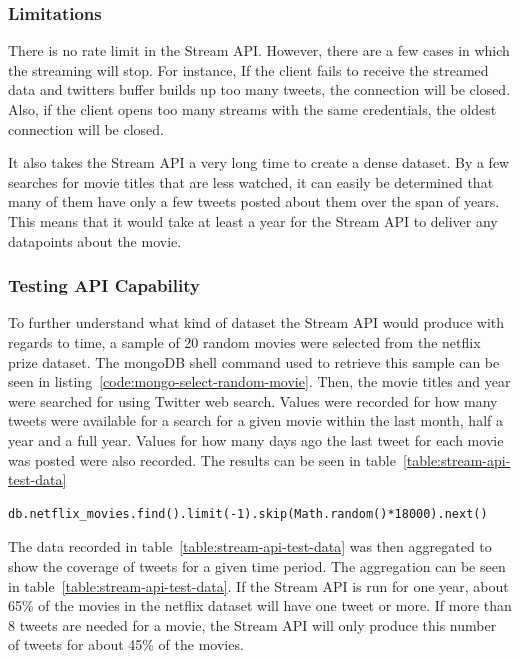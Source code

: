 \subsubsection{Limitations}
There is no rate limit in the Stream API. However, there are a few cases in which the streaming will stop. For instance, If the client fails to receive the streamed data and twitters buffer builds up too many tweets, the connection will be closed. Also, if the client opens too many streams with the same credentials, the oldest connection will be closed.

It also takes the Stream API a very long time to create a dense dataset. By a few searches for movie titles that are less watched, it can easily be determined that many of them have only a few tweets posted about them over the span of years. This means that it would take at least a year for the Stream API to deliver any datapoints about the movie.

\subsubsection{Testing API Capability}\label{sec:pre-stream-api-testing}
To further understand what kind of dataset the Stream API would produce with regards to time, a sample of 20 random movies were selected from the netflix prize dataset. The mongoDB shell command used to retrieve this sample can be seen in listing~\ref{code:mongo-select-random-movie}. Then, the movie titles and year were searched for using Twitter web search. Values were recorded for how many tweets were available for a search for a given movie within the last month, half a year and a full year. Values for how many days ago the last tweet for each movie was posted were also recorded. The results can be seen in table~\ref{table:stream-api-test-data}

\begin{lstlisting}[caption={The mongoDB console command used to generate a random selection of movies},label={code:mongo-select-random-movie},captionpos=b]
db.netflix_movies.find().limit(-1).skip(Math.random()*18000).next()
\end{lstlisting}

The data recorded in table~\ref{table:stream-api-test-data} was then aggregated to show the coverage of tweets for a given time period. The aggregation can be seen in table~\ref{table:stream-api-test-data}. If the Stream API is run for one year, about 65\% of the movies in the netflix dataset will have one tweet or more. If more than 8 tweets are needed for a movie, the Stream API will only produce this number of tweets for about 45\% of the movies.


